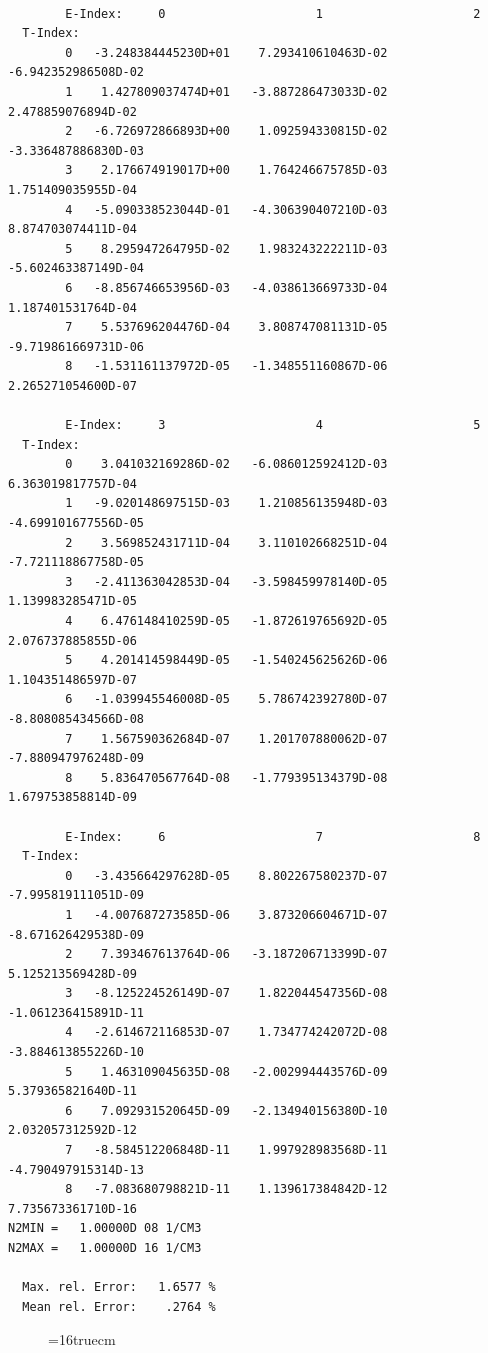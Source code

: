 \documentclass[12pt,dvipdfmx]{article}
\begin{document}
\begin{small}\begin{verbatim}

        E-Index:     0                     1                     2
  T-Index:
        0   -3.248384445230D+01    7.293410610463D-02   -6.942352986508D-02
        1    1.427809037474D+01   -3.887286473033D-02    2.478859076894D-02
        2   -6.726972866893D+00    1.092594330815D-02   -3.336487886830D-03
        3    2.176674919017D+00    1.764246675785D-03    1.751409035955D-04
        4   -5.090338523044D-01   -4.306390407210D-03    8.874703074411D-04
        5    8.295947264795D-02    1.983243222211D-03   -5.602463387149D-04
        6   -8.856746653956D-03   -4.038613669733D-04    1.187401531764D-04
        7    5.537696204476D-04    3.808747081131D-05   -9.719861669731D-06
        8   -1.531161137972D-05   -1.348551160867D-06    2.265271054600D-07

        E-Index:     3                     4                     5
  T-Index:
        0    3.041032169286D-02   -6.086012592412D-03    6.363019817757D-04
        1   -9.020148697515D-03    1.210856135948D-03   -4.699101677556D-05
        2    3.569852431711D-04    3.110102668251D-04   -7.721118867758D-05
        3   -2.411363042853D-04   -3.598459978140D-05    1.139983285471D-05
        4    6.476148410259D-05   -1.872619765692D-05    2.076737885855D-06
        5    4.201414598449D-05   -1.540245625626D-06    1.104351486597D-07
        6   -1.039945546008D-05    5.786742392780D-07   -8.808085434566D-08
        7    1.567590362684D-07    1.201707880062D-07   -7.880947976248D-09
        8    5.836470567764D-08   -1.779395134379D-08    1.679753858814D-09

        E-Index:     6                     7                     8
  T-Index:
        0   -3.435664297628D-05    8.802267580237D-07   -7.995819111051D-09
        1   -4.007687273585D-06    3.873206604671D-07   -8.671626429538D-09
        2    7.393467613764D-06   -3.187206713399D-07    5.125213569428D-09
        3   -8.125224526149D-07    1.822044547356D-08   -1.061236415891D-11
        4   -2.614672116853D-07    1.734774242072D-08   -3.884613855226D-10
        5    1.463109045635D-08   -2.002994443576D-09    5.379365821640D-11
        6    7.092931520645D-09   -2.134940156380D-10    2.032057312592D-12
        7   -8.584512206848D-11    1.997928983568D-11   -4.790497915314D-13
        8   -7.083680798821D-11    1.139617384842D-12    7.735673361710D-16
N2MIN =   1.00000D 08 1/CM3
N2MAX =   1.00000D 16 1/CM3

  Max. rel. Error:   1.6577 %
  Mean rel. Error:    .2764 %

\end{verbatim}\end{small}
\begin{figure} \label{2.1.5b}
\epsfxsize=16truecm
\end{figure}
\newpage
\end{document}
